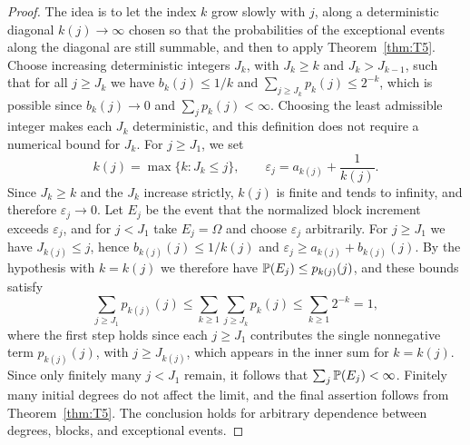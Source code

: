 \begin{proof}
The idea is to let the index $k$ grow slowly with $j$, along a
deterministic diagonal $k(j)\to\infty$ chosen so that the probabilities
of the exceptional events along the diagonal are still summable, and then
to apply Theorem~\ref{thm:T5}.
Choose increasing deterministic integers
$J_k$, with $J_k\geq k$ and $J_k>J_{k-1}$, such that for all
$j\geq J_k$ we have $b_k(j)\leq1/k$ and
$\sum_{j\geq J_k}p_k(j)\leq2^{-k}$, which is possible since $b_k(j)\to0$
and $\sum_jp_k(j)<\infty$.
Choosing the least admissible integer makes each $J_k$ deterministic,
and this definition does not require a numerical bound for $J_k$.
For $j\geq J_1$, we set
\[
 k(j)=\max\{k:J_k\leq j\},\qquad
 \varepsilon_j=a_{k(j)}+\frac1{k(j)}.
\]
Since $J_k\geq k$ and the $J_k$ increase strictly, $k(j)$ is finite
and tends to infinity, and therefore $\varepsilon_j\to0$. Let $E_j$ be
the event that the normalized block increment exceeds $\varepsilon_j$,
and for $j<J_1$ take $E_j=\Omega$ and choose $\varepsilon_j$ arbitrarily.
For $j\geq J_1$ we have $J_{k(j)}\leq j$, hence $b_{k(j)}(j)\leq1/k(j)$
and $\varepsilon_j\geq a_{k(j)}+b_{k(j)}(j)$. By the hypothesis with
$k=k(j)$ we therefore have $\mathbb P(E_j)\leq p_{k(j)}(j)$, and these bounds
satisfy
\[
 \sum_{j\geq J_1}p_{k(j)}(j)
 \leq\sum_{k\geq1}\sum_{j\geq J_k}p_k(j)
 \leq\sum_{k\geq1}2^{-k}
 =1,
\]
where the first step holds since each $j\geq J_1$ contributes the single
nonnegative term $p_{k(j)}(j)$, with $j\geq J_{k(j)}$, which appears in the
inner sum for $k=k(j)$.
Since only finitely many $j<J_1$ remain, it follows that
$\sum_j\mathbb P(E_j)<\infty$.
Finitely many initial degrees do not affect the limit, and the final
assertion follows from Theorem~\ref{thm:T5}.
The conclusion holds for arbitrary dependence between degrees,
blocks, and exceptional events.
\end{proof}

